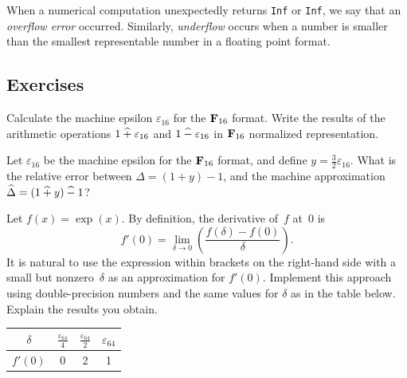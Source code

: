 When a numerical computation unexpectedly returns \texttt{Inf} or \texttt{Inf},
we say that an \emph{overflow error} occurred.
Similarly, \emph{underflow} occurs when a number
is smaller than the smallest representable number in a floating point format.

\subsection{Exercises}%


\begin{exercise}
    Calculate the machine epsilon $\varepsilon_{16}$ for the $\mathbf F_{16}$ format.
    Write the results of the arithmetic operations $1 \mathbin{\widehat +} \varepsilon_{16}$ and $1 \mathbin{\widehat -} \varepsilon_{16}$ in $\mathbf F_{16}$ normalized representation.
\end{exercise}

\begin{exercise}
    Let $\varepsilon_{16}$ be the machine epsilon for the $\mathbf F_{16}$ format,
    and define $y = \frac{3}{2} \varepsilon_{16}$.
    What is the relative error between $\Delta = (1 + y) - 1$,
    and the machine approximation $\widehat \Delta = (1 \mathbin{\widehat +} y) \mathbin{\widehat -} 1$?
\end{exercise}

\begin{exercise}
    Let $f(x) = \exp(x)$.
    By definition, the derivative of~$f$ at~$0$ is
    \[
        f'(0) = \lim_{\delta \to 0} \left( \frac{f(\delta) - f(0)}{\delta} \right).
    \]
    It is natural to use the expression within brackets on the right-hand side
    with a small but nonzero~$\delta$ as an approximation for $f'(0)$.
    Implement this approach using double-precision numbers and the same values for $\delta$ as in the table below.
    Explain the results you obtain.
    \begin{center}
        \def\arraystretch{1.5}
        \begin{tabular}{|c|c|c|c|}
            \hline
            $\delta$ & $\frac{\varepsilon_{64}}{4} $ & $\frac{\varepsilon_{64}}{2}$ & $\varepsilon_{64}$ \\
            \hline
            $f'(0)$ & 0 & 2 & 1 \\
            \hline
        \end{tabular}
    \end{center}
\end{exercise}

